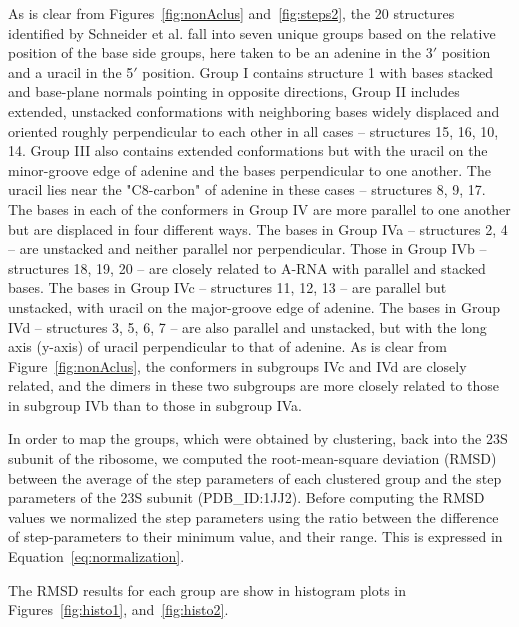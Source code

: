 As is clear  from Figures~\ref{fig:nonAclus} and~\ref{fig:steps2}, the
20 structures  identified by Schneider  et al. fall into  seven unique
groups based  on the relative position  of the base  side groups, here
taken to be an  adenine in the 3$'$ position and a  uracil in the 5$'$
position.   Group I  contains  structure {1}  with  bases stacked  and
base-plane normals pointing in  opposite directions, Group II includes
extended,  unstacked  conformations   with  neighboring  bases  widely
displaced  and oriented  roughly perpendicular  to each  other  in all
cases -- structures {15, 16, 10, 14}. Group III also contains extended
conformations but with the uracil  on the minor-groove edge of adenine
and the bases  perpendicular to one another. The  uracil lies near the
"C8-carbon" of  adenine in these cases  -- structures {8,  9, 17}. The
bases in each  of the conformers in Group IV are  more parallel to one
another but are displaced in  four different ways.  The bases in Group
IVa --  structures {2,  4} -- are  unstacked and neither  parallel nor
perpendicular.  Those in  Group IVb -- structures {18,  19, 20} -- are
closely related to A-RNA with parallel and stacked bases. The bases in
Group IVc  -- structures {11, 12,  13} -- are  parallel but unstacked,
with uracil on  the major-groove edge of adenine.   The bases in Group
IVd -- structures {3, 5, 6, 7} -- are also parallel and unstacked, but
with  the  long axis  (y-axis)  of  uracil  perpendicular to  that  of
adenine.  As  is clear from  Figure~\ref{fig:nonAclus}, the conformers
in subgroups IVc and IVd are  closely related, and the dimers in these
two subgroups are  more closely related to those  in subgroup IVb than
to those in subgroup IVa.

In order  to map the groups,  which were obtained  by clustering, back
into the 23S subunit of the ribosome, we computed the root-mean-square
deviation (RMSD)  between the average  of the step parameters  of each
clustered  group   and  the  step   parameters  of  the   23S  subunit
(PDB\_ID:1JJ2).  Before  computing the  RMSD values we  normalized the
step   parameters  using   the   ratio  between   the  difference   of
step-parameters  to their  minimum value,  and their  range.   This is
expressed in Equation~\ref{eq:normalization}.

The  RMSD  results for  each  group are  show  in  histogram plots  in
Figures~\ref{fig:histo1}, and~\ref{fig:histo2}.

